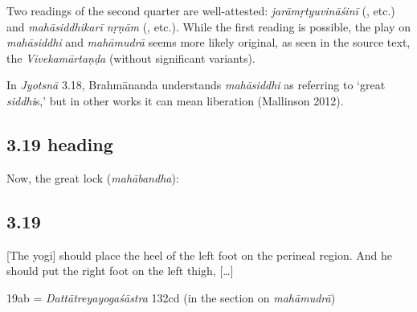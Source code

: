 \begin{ekdosis}
\begin{philcomm}[hp03_018]
Two readings of the second quarter are well-attested: \emph{jarāmṛtyuvināśinī} (\alphaOne, etc.) and \emph{mahāsiddhikarī nṛṇām} (\alphaThree, etc.). While the first reading is possible, the play on \emph{mahāsiddhi} and \emph{mahāmudrā} seems more likely original, as seen in the source text, the \emph{Vivekamārtaṇḍa} (without significant variants).\lb



In \emph{Jyotsnā} 3.18, Brahmānanda understands \emph{mahāsiddhi} as referring to `great \emph{siddhi}s,' but in other works it can mean liberation (Mallinson 2012).
\end{philcomm}

\subsection*{3.19 heading}
\begin{translation}[hp03_019a]
Now, the great lock (\emph{mahābandha}):
\end{translation}


\subsection*{3.19}
\begin{translation}[hp03_019]
{}[The yogi] should place the heel of the left foot on the perineal region. And he should put the right foot on the left thigh, [\dots]
\end{translation}

\begin{sources}[hp03_019]
19ab = \emph{Dattātreyayogaśāstra} 132cd (in the section on \emph{mahāmudrā})
\begin{versinnote}
\end{versinnote}


\end{sources}
\end{ekdosis}
